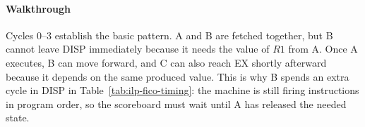 \begin{table}[t]
    \centering
    \setlength{\tabcolsep}{4pt}
    \renewcommand{\arraystretch}{1.15}
    \caption{Timing table for a simplified FICO schedule. Repeated DISP entries indicate that an instruction remains blocked in the in-order dispatch-and-fire path while waiting for data or hardware to become available.}
    \label{tab:ilp-fico-timing}
\end{table}

\paragraph{Walkthrough}\label{par:ilp-fico-example-walkthrough}
Cycles 0--3 establish the basic pattern.
A and B are fetched together, but B cannot leave DISP immediately because it needs the value of $R1$ from A\@.
Once A executes, B can move forward, and C can also reach EX shortly afterward because it depends on the same produced value.
This is why B spends an extra cycle in DISP in Table~\ref{tab:ilp-fico-timing}: the machine is still firing instructions in program order, so the scoreboard must wait until A has released the needed state.

